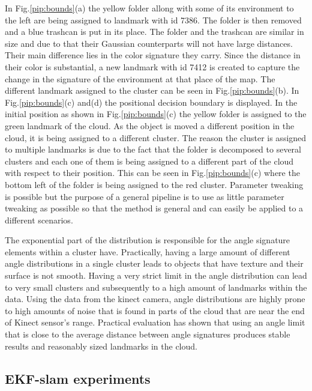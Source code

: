 \documentclass[]{article}
\begin{document}
    In Fig.\ref{pip:bounds}(a) the yellow folder allong with some of its environment to the left are being assigned to landmark with id 7386. The folder is then removed and a blue trashcan is put in its place. The folder and the trashcan are similar in size and due to that their Gaussian counterparts will not have large distances. Their main difference lies in the color signature they carry. Since the distance in their color is substantial, a new landmark with id 7412 is created to capture the change in the signature of the environment at that place of the map. The different landmark assigned to the cluster can be seen in Fig.\ref{pip:bounds}(b). In Fig.\ref{pip:bounds}(c) and(d) the positional decision boundary is displayed. In the initial position as shown in Fig.\ref{pip:bounds}(c) the yellow folder is assigned to the green landmark of the cloud. As the object is moved a different position in the cloud, it is being assigned to a different cluster. The reason the cluster is assigned to multiple landmarks is due to the fact that the folder is decomposed to several clusters and each one of them is being assigned to a different part of the cloud with respect to their position. This can be seen in Fig.\ref{pip:bounds}(c) where the bottom left of the folder is being assigned to the red cluster. Parameter tweaking is possible but the purpose of a general pipeline is to use as little parameter tweaking as possible so that the method is general and can easily be applied to a different scenarios.


The exponential part of the distribution is responsible for the angle signature elements within a cluster have. Practically, having a large amount of different angle distributions in a single cluster leads to objects that have texture and their surface is not smooth. Having a very strict limit in the angle distribution can lead to very small clusters and subsequently to a high amount of landmarks within the data. Using the data from the kinect camera, angle distributions are highly prone to high amounts of noise that is found in parts of the cloud that are near the end of Kinect sensor's range. Practical evaluation has shown that using an angle limit that is close to the average distance between angle signatures produces stable results and reasonably sized landmarks in the cloud.

    \subsection{EKF-slam experiments}
\end{document}
